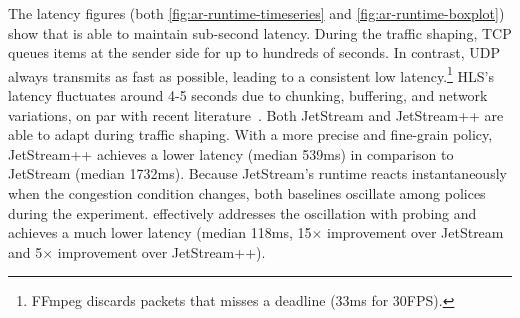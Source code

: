 
The latency figures (both \autoref{fig:ar-runtime-timeseries} and
\autoref{fig:ar-runtime-boxplot}) show that \sysname{} is able to maintain
sub-second latency. During the traffic shaping, TCP queues items at the sender
side for up to hundreds of seconds. In contrast, UDP always transmits as fast as
possible, leading to a consistent low latency.\footnote{FFmpeg discards packets
  that misses a deadline (33ms for 30FPS).} HLS's latency fluctuates around 4-5
seconds due to chunking, buffering, and network variations, on par with recent
literature~\cite{wang2016anatomy}. Both JetStream and JetStream++ are able to
adapt during traffic shaping. With a more precise and fine-grain policy,
JetStream++ achieves a lower latency (median 539ms) in comparison to JetStream
(median 1732ms). Because JetStream's runtime reacts instantaneously when the
congestion condition changes, both baselines oscillate among polices during the
experiment. \sysname{} effectively addresses the oscillation with probing and
achieves a much lower latency (median 118ms, 15$\times$ improvement over
JetStream and 5$\times$ improvement over JetStream++).


